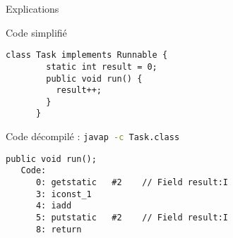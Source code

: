 
\begingroup

\begin{frame}[fragile]{Explications}
  \begin{block}{Code simplifié}
    \vspace{-3mm}
    \begin{lstlisting}[numbers=none]
      class Task implements Runnable {
        static int result = 0;
        public void run() {
          result++;
        }
      }
    \end{lstlisting}
  \end{block}
  \pause
  \vfill
  \begin{block}{Code décompilé : \lstinline[language=bash]{javap -c Task.class}}
    \vspace{-3mm}
\begin{verbatim}
public void run();
   Code:
      0: getstatic   #2    // Field result:I
      3: iconst_1
      4: iadd
      5: putstatic   #2    // Field result:I
      8: return
\end{verbatim}
  \end{block}
\end{frame}

\endgroup
\endinput
